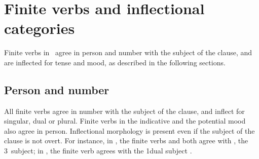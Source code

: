 \section{Finite verbs and inflectional categories}\label{inflectionalCatsVerbs}
Finite verbs in \PS\ agree in person and number with the subject of the clause, and are inflected for tense and mood, as described in the following sections. %


\subsection{Person and number}\label{personNumberVerbs}
All finite verbs agree in number with the subject of the clause, and inflect for singular, dual or plural. 
Finite verbs in the indicative and the potential mood also agree in person. %
Inflectional morphology is present even if the subject of the clause is not overt. 
For instance, in , the finite verbs  and  both agree with , the 3\PLs\ subject; in , the finite verb  agrees with the 1dual subject .

